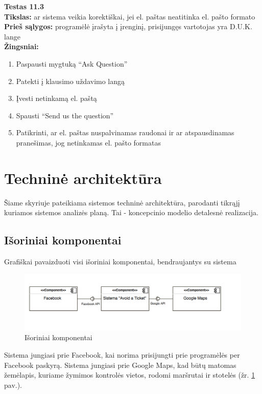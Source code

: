 \documentclass{VUMIFPSkursinis}
\begin{document}
		\textbf{Testas 11.3}\\
		\textbf{Tikslas:} ar sistema veikia korektiškai, jei el. paštas neatitinka el. pašto formato\\
		\textbf{Prieš sąlygos:} programėlė įrašyta į įrenginį, prisijungęs vartotojas yra D.U.K. lange\\
		\textbf{Žingsniai:}
		\begin{enumerate}[noitemsep,topsep=0pt]
			\item Paspausti mygtuką “Ask Question”
			\item Patekti į klausimo uždavimo langą
			\item Įvesti netinkamą el. paštą
			\item Spausti “Send us the question”
			\item Patikrinti, ar el. paštas nuspalvinamas raudonai ir ar atspausdinamas pranešimas, jog netinkamas el. pašto formatas
		\end{enumerate}
\section{Techninė architektūra}

Šiame skyriuje pateikiama sistemos techninė architektūra, parodanti tikrąjį kuriamos sistemos analizės planą. Tai - koncepcinio modelio detalesnė realizacija.
\subsection{Išoriniai komponentai}
Grafiškai pavaizduoti visi išoriniai komponentai, bendraujantys su sistema
\begin{figure}[H]
	\centering
	\includegraphics[scale=0.7]{img/Isoriniai_komponentai}
	\caption{Išoriniai komponentai}
	\label{img:Išoriniai komponentai}
\end{figure}

Sistema jungiasi prie Facebook, kai norima prisijungti prie programėlės per Facebook paskyrą.
Sistema jungiasi prie Google Maps, kad būtų matomas žemėlapis, kuriame žymimos kontrolės vietos, rodomi maršrutai ir stotelės (žr. \ref{img:Išoriniai komponentai} pav.).
\end{document}

